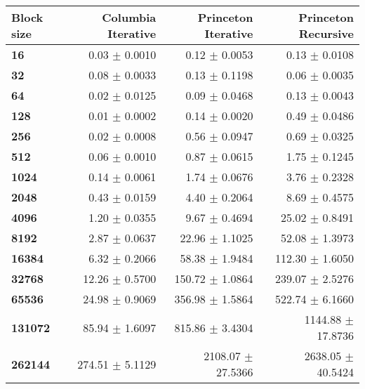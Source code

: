 \begin{tabular}{lrrr}\toprule
\textbf{Block size}  & \textbf{Columbia Iterative} & \textbf{Princeton Iterative} & \textbf{Princeton Recursive}\\\midrule
\textbf{16}  & 0.03 $\pm$ 0.0010 & 0.12 $\pm$ 0.0053 & 0.13 $\pm$ 0.0108\\
\textbf{32}  & 0.08 $\pm$ 0.0033 & 0.13 $\pm$ 0.1198 & 0.06 $\pm$ 0.0035\\
\textbf{64}  & 0.02 $\pm$ 0.0125 & 0.09 $\pm$ 0.0468 & 0.13 $\pm$ 0.0043\\
\textbf{128}  & 0.01 $\pm$ 0.0002 & 0.14 $\pm$ 0.0020 & 0.49 $\pm$ 0.0486\\
\textbf{256}  & 0.02 $\pm$ 0.0008 & 0.56 $\pm$ 0.0947 & 0.69 $\pm$ 0.0325\\
\textbf{512}  & 0.06 $\pm$ 0.0010 & 0.87 $\pm$ 0.0615 & 1.75 $\pm$ 0.1245\\
\textbf{1024}  & 0.14 $\pm$ 0.0061 & 1.74 $\pm$ 0.0676 & 3.76 $\pm$ 0.2328\\
\textbf{2048}  & 0.43 $\pm$ 0.0159 & 4.40 $\pm$ 0.2064 & 8.69 $\pm$ 0.4575\\
\textbf{4096}  & 1.20 $\pm$ 0.0355 & 9.67 $\pm$ 0.4694 & 25.02 $\pm$ 0.8491\\
\textbf{8192}  & 2.87 $\pm$ 0.0637 & 22.96 $\pm$ 1.1025 & 52.08 $\pm$ 1.3973\\
\textbf{16384}  & 6.32 $\pm$ 0.2066 & 58.38 $\pm$ 1.9484 & 112.30 $\pm$ 1.6050\\
\textbf{32768}  & 12.26 $\pm$ 0.5700 & 150.72 $\pm$ 1.0864 & 239.07 $\pm$ 2.5276\\
\textbf{65536}  & 24.98 $\pm$ 0.9069 & 356.98 $\pm$ 1.5864 & 522.74 $\pm$ 6.1660\\
\textbf{131072}  & 85.94 $\pm$ 1.6097 & 815.86 $\pm$ 3.4304 & 1144.88 $\pm$ 17.8736\\
\textbf{262144} & 274.51 $\pm$ 5.1129 & 2108.07 $\pm$ 27.5366 & 2638.05 $\pm$ 40.5424\\
\bottomrule
\end{tabular}
